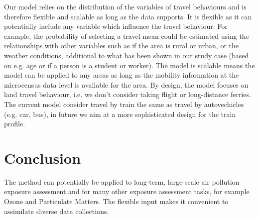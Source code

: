 \documentclass[]{article}
\begin{document}
Our model relies on the distribution of the variables of travel behaviours and is therefore flexible and scalable as long as the data supports. It is flexible as it can potentially include any variable which influence the travel behaviour. For example, the probability of selecting a travel mean could be estimated using the relationships with other variables such as if the area is rural or urban, or the weather conditions, additional to what has been shown in our study case (based on e.g. age or if a person is a student or worker). The model is scalable means the model can be applied to any areas as long as the mobility information at the microcensus data level is available for the area. By design, the model focuses on land travel behaviour, i.e. we don't consider taking flight or long-distance ferries. The current model consider travel by train the same as travel by autovechicles (e.g. car, bus), in future we aim at a more sophisticated design for the train profile. 
    
\section{Conclusion}
\label{sec:con}

The method can potentially be applied to long-term, large-scale air pollution exposure assessment and for many other exposure assessment tasks, for example Ozone and Particulate Matters. The flexible input makes it convenient to assimilate diverse data collections.


\newpage


\end{document}
